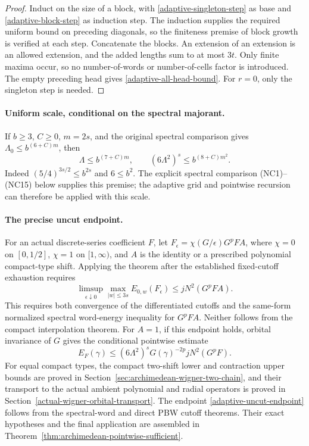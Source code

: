 \begin{proof}
Induct on the size of a block, with
\eqref{adaptive-singleton-step} as base and
\eqref{adaptive-block-step} as induction step.  The induction
supplies the required uniform bound on preceding diagonals, so
the finiteness premise of block growth is verified at each step.
Concatenate the blocks.  An extension of an extension is an
allowed extension, and the added lengths sum to at most $3t$.
Only finite maxima occur, so no number-of-words or number-of-cells
factor is introduced.  The empty preceding head gives
\eqref{adaptive-all-head-bound}.  For $r=0$, only the singleton
step is needed.
\end{proof}

\paragraph{Uniform scale, conditional on the spectral majorant.}
If $b\ge3$, $C\ge0$, $m=2s$, and the original spectral comparison
gives $\Lambda_0\le b^{(6+C)m}$, then
\[
 \Lambda\le b^{(7+C)m},\qquad
 (6\Lambda^2)^s\le b^{(8+C)m^2}.
\]
Indeed $(5/4)^{3s/2}\le b^{2s}$ and $6\le b^2$.
The explicit spectral comparison (NC1)--(NC15) below supplies
this premise; the adaptive grid and pointwise recursion can
therefore be applied with this scale.

\paragraph{The precise uncut endpoint.}
For an actual discrete-series coefficient $F$, let
$F_\epsilon=\chi(G/\epsilon)G^pFA$, where $\chi=0$ on
$[0,1/2]$, $\chi=1$ on $[1,\infty)$, and $A$ is the identity
or a prescribed polynomial compact-type shift.  Applying the
theorem after the established fixed-cutoff exhaustion requires
\begin{equation}\label{adaptive-uncut-endpoint}
 \limsup_{\epsilon\downarrow0}
 \max_{|w|\le3s}E_{0,w}(F_\epsilon)
       \le jN^2(G^pFA).
\end{equation}
This requires both convergence of the differentiated cutoffs and
the same-form normalized spectral word-energy inequality for
$G^pFA$.  Neither follows from the compact interpolation theorem.
For $A=1$, if this endpoint holds, orbital invariance of $G$ gives
the conditional pointwise estimate
\[
 E_F(\gamma)\le(6\Lambda^2)^sG(\gamma)^{-2p}
                   jN^2(G^pF).
\]
For equal compact types, the compact two-shift lower and contraction
upper bounds are proved in
Section~\ref{sec:archimedean-wigner-two-chain}, and their transport
to the actual ambient polynomial and radial operators is proved
in Section~\ref{actual-wigner-orbital-transport}. The endpoint
\eqref{adaptive-uncut-endpoint} follows from the spectral-word
and direct PBW cutoff theorems. Their exact hypotheses and the
final application are assembled in
Theorem~\ref{thm:archimedean-pointwise-sufficient}.

